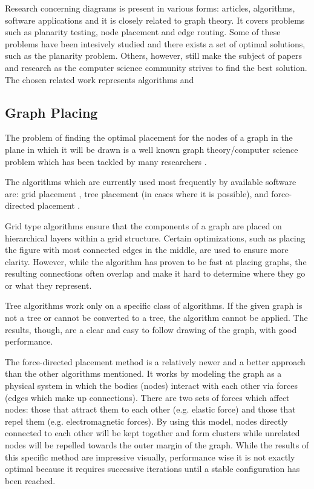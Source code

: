 Research concerning diagrams is present in various forms: articles, algorithms, software applications and it is closely
related to graph theory. It covers problems such as planarity testing, node placement and edge routing. Some of these 
problems have been intesively studied and there exists a set of optimal solutions, such as the planarity problem. Others, 
however, still make the subject of papers and research as the computer science community strives to find the best solution. 
The chosen related work represents algorithms and 

\subsection{Graph Placing}

The problem of finding the optimal placement for the nodes of a graph in the plane
in which it will be drawn is a well known graph theory/computer science problem
which has been tackled by many researchers \cite{gansner2005graph}.

The algorithms which are currently used most frequently by available software are:
grid placement \cite{tamassia1987embedding}, tree placement (in cases where it is possible), and force-directed placement \cite{hu2005efficient}.

Grid type algorithms ensure that the components of a graph are placed on hierarchical layers within a
grid structure. Certain optimizations, such as placing the figure with most connected edges in the middle,
are used to ensure more clarity. However, while the algorithm has proven to be fast at placing graphs,
the resulting connections often overlap and make it hard to determine where they go or what they represent.

Tree algorithms work only on a specific class of algorithms. If the given graph is not a tree or cannot be
converted to a tree, the algorithm cannot be applied. The results, though, are a clear and easy to follow
drawing of the graph, with good performance.

The force-directed placement method is a relatively newer and a better approach than the other algorithms mentioned.
It works by modeling the graph as a physical system in which the bodies (nodes) interact with each other via
forces (edges which make up connections). There are two sets of forces which affect nodes: those that attract
them to each other (e.g. elastic force) and those that repel them (e.g. electromagnetic forces). By using
this model, nodes directly connected to each other will be kept together and form clusters while unrelated
nodes will be repelled towards the outer margin of the graph. While the results of this specific method are
impressive visually, performance wise it is not exactly optimal because it requires successive iterations
until a stable configuration has been reached.

